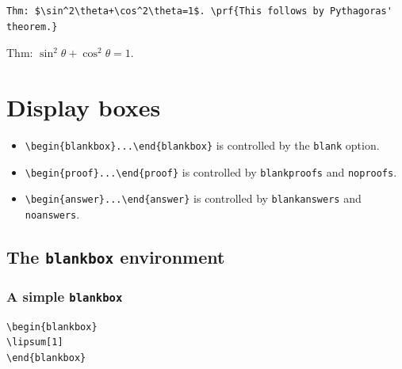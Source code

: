 \documentclass{article}
\theoremstyle{definition}
\begin{document}
\begin{Verbatim}[frame=single]
Thm: $\sin^2\theta+\cos^2\theta=1$. \prf{This follows by Pythagoras' theorem.}
\end{Verbatim}
Thm: $\sin^2\theta+\cos^2\theta=1$. 



\section{Display boxes}
\begin{itemize}
\item \verb+\begin{blankbox}...\end{blankbox}+ is controlled by the \verb+blank+ option.
\item \verb+\begin{proof}...\end{proof}+ is controlled by \verb+blankproofs+ and \verb+noproofs+.
\item \verb+\begin{answer}...\end{answer}+ is controlled by \verb+blankanswers+ and \verb+noanswers+.
\end{itemize}

\subsection{The {\tt blankbox} environment}

\subsubsection{A simple {\tt blankbox}}

\begin{Verbatim}[frame=single]
\begin{blankbox}
\lipsum[1]
\end{blankbox}
\end{Verbatim}
\begin{blankbox}
\lipsum[1]
\end{blankbox}
\end{document}
